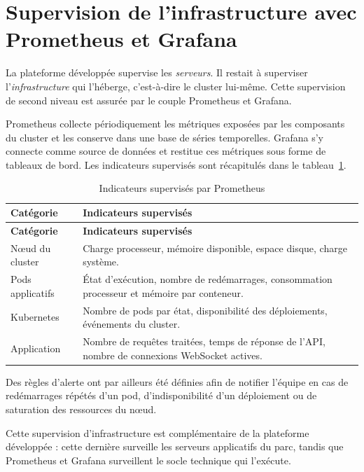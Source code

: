 \section{Supervision de l'infrastructure avec Prometheus et Grafana}
La plateforme développée supervise les \emph{serveurs}. Il restait à superviser
l'\emph{infrastructure} qui l'héberge, c'est-à-dire le cluster lui-même. Cette
supervision de second niveau est assurée par le couple Prometheus et Grafana.

Prometheus collecte périodiquement les métriques exposées par les composants du cluster
et les conserve dans une base de séries temporelles. Grafana s'y connecte comme source de
données et restitue ces métriques sous forme de tableaux de bord. Les indicateurs
supervisés sont récapitulés dans le tableau~\ref{tab:prom}.

\renewcommand{\arraystretch}{1.3}
\begin{longtable}{|>{\raggedright\arraybackslash}p{4.4cm}
                  |>{\raggedright\arraybackslash}p{9.4cm}|}
\hline
\textbf{Catégorie} & \textbf{Indicateurs supervisés} \\
\hline
\endfirsthead

\hline
\textbf{Catégorie} & \textbf{Indicateurs supervisés} \\
\hline
\endhead

\hline
\caption{Indicateurs supervisés par Prometheus}
\label{tab:prom}
\endlastfoot

N\oe ud du cluster & Charge processeur, mémoire disponible, espace disque, charge système. \\
\hline
Pods applicatifs & État d'exécution, nombre de redémarrages, consommation processeur et mémoire par conteneur. \\
\hline
Kubernetes & Nombre de pods par état, disponibilité des déploiements, événements du cluster. \\
\hline
Application & Nombre de requêtes traitées, temps de réponse de l'API, nombre de connexions WebSocket actives. \\
\hline

\end{longtable}

Des règles d'alerte ont par ailleurs été définies afin de notifier l'équipe en cas de
redémarrages répétés d'un pod, d'indisponibilité d'un déploiement ou de saturation des
ressources du n\oe ud.

Cette supervision d'infrastructure est complémentaire de la plateforme développée : cette
dernière surveille les serveurs applicatifs du parc, tandis que Prometheus et Grafana
surveillent le socle technique qui l'exécute.

